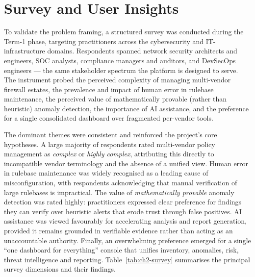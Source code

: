 \section{Survey and User Insights}
\label{sec:ch2-survey}
To validate the problem framing, a structured survey was conducted during the Term-1 phase, targeting practitioners across the cybersecurity and IT-infrastructure domains. Respondents spanned network security architects and engineers, SOC analysts, compliance managers and auditors, and DevSecOps engineers --- the same stakeholder spectrum the platform is designed to serve. The instrument probed the perceived complexity of managing multi-vendor firewall estates, the prevalence and impact of human error in rulebase maintenance, the perceived value of mathematically provable (rather than heuristic) anomaly detection, the importance of AI assistance, and the preference for a single consolidated dashboard over fragmented per-vendor tools.

The dominant themes were consistent and reinforced the project's core hypotheses. A large majority of respondents rated multi-vendor policy management as \emph{complex} or \emph{highly complex}, attributing this directly to incompatible vendor terminology and the absence of a unified view. Human error in rulebase maintenance was widely recognised as a leading cause of misconfiguration, with respondents acknowledging that manual verification of large rulebases is impractical. The value of \emph{mathematically provable} anomaly detection was rated highly: practitioners expressed clear preference for findings they can verify over heuristic alerts that erode trust through false positives. AI assistance was viewed favourably for accelerating analysis and report generation, provided it remains grounded in verifiable evidence rather than acting as an unaccountable authority. Finally, an overwhelming preference emerged for a single ``one dashboard for everything'' console that unifies inventory, anomalies, risk, threat intelligence and reporting. Table~\ref{tab:ch2-survey} summarises the principal survey dimensions and their findings.

